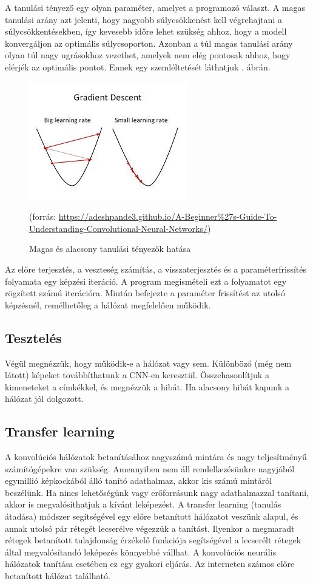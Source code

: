 A tanulási tényező egy olyan paraméter, amelyet a programozó választ. A magas tanulási arány azt jelenti, hogy nagyobb súlycsökkenést kell végrehajtani a súlycsökkentésekben, így kevesebb időre lehet szükség ahhoz, hogy a modell konvergáljon az optimális súlycsoporton. Azonban a túl magas tanulási arány olyan túl nagy ugrásokhoz vezethet, amelyek nem elég pontosak ahhoz, hogy elérjék az optimális pontot. Ennek egy szemléltetését láthatjuk . ábrán.

\begin{figure}[h]
\centering
\includegraphics[scale=0.8]{images/CNN_learning_rate}
\caption{Magas és alacsony tanulási tényezők hatása}
(forrás: \url{https://adeshpande3.github.io/A-Beginner%27s-Guide-To-Understanding-Convolutional-Neural-Networks/})
\label{fig:CNN_learning_rate}
\end{figure}

Az előre terjesztés, a veszteség számítás, a visszaterjesztés és a paraméterfrissítés folyamata egy képzési iteráció. A program megismételi ezt a folyamatot egy rögzített számú iterációra. Miután befejezte a paraméter frissítést az utolsó képzésnél, remélhetőleg a hálózat megfelelően működik.

\subsection{Tesztelés}

Végül megnézzük, hogy működik-e a hálózat vagy sem. Különböző (még nem látott) képeket továbbíthatunk a CNN-en keresztül. Összehasonlítjuk a kimeneteket a címkékkel, és megnézzük a hibát. Ha alacsony hibát kapunk a hálózat jól dolgozott.

\subsection{Transfer learning}

A konvolúciós hálózatok betanításához nagyszámú mintára és nagy teljesítményű számítógépekre van szükség. Amennyiben nem áll rendelkezésünkre nagyjából egymillió képkockából álló tanító adathalmaz, akkor kis számú mintáról beszélünk. Ha nincs lehetőségünk vagy erőforrásunk nagy adathalmazzal tanítani, akkor is megvalósíthatjuk a kívánt leképezést. A transfer learning (tanulás átadása) módszer segítségével egy előre betanított hálózatot veszünk alapul, és annak utolsó pár rétegét lecserélve végezzük a tanítást. Ilyenkor a megmaradt rétegek betanított tulajdonság érzékelő funkciója segítségével a lecserélt rétegek által megvalósítandó leképezés könnyebbé vállhat. A konvolúciós neurális hálózatok tanítása esetében ez egy gyakori eljárás. Az interneten számos előre betanított hálózat található.
